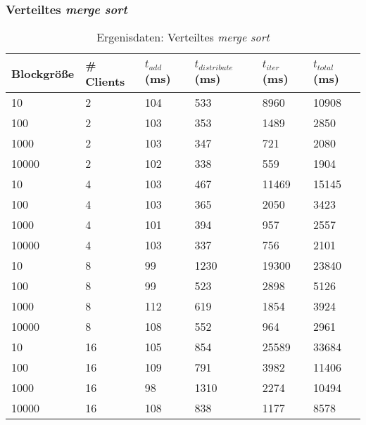 \documentclass[fontsize=12pt,a4paper,headinclude=no,headings=small]{scrartcl}
\begin{document}
\subsubsection{Verteiltes \textit{merge sort}}
\begin{table}[htp]
\begin{tabularx}{\textwidth}{ |X|X|X|X|X|X| }
\hline
Blockgröße & \# Clients & $t_{add}$ (ms) & $t_{distribute}$ (ms) & $t_{iter}$ (ms) & $t_{total}$ (ms) \\
\hline
10 & 2 & 104 & 533 & 8960 & 10908 \\
100 & 2 & 103 & 353 & 1489 & 2850 \\
1000 & 2 & 103 & 347 & 721 & 2080 \\
10000 & 2 & 102 & 338 & 559 & 1904 \\
\hline
10 & 4 & 103 & 467 & 11469 & 15145 \\
100 & 4 & 103 & 365 & 2050 & 3423 \\
1000 & 4 & 101 & 394 & 957 & 2557 \\
10000 & 4 & 103 & 337 & 756 & 2101 \\
\hline
10 & 8 & 99 & 1230 & 19300 & 23840 \\
100 & 8 & 99 & 523 & 2898 & 5126 \\
1000 & 8 & 112 & 619 & 1854 & 3924 \\
10000 & 8 & 108 & 552 & 964 & 2961 \\
\hline
10 & 16 & 105 & 854 & 25589 & 33684 \\
100 & 16 & 109 & 791 & 3982 & 11406 \\
1000 & 16 & 98 & 1310 & 2274 & 10494 \\
10000 & 16 & 108 & 838 & 1177 & 8578 \\
\hline
\end{tabularx}
\caption{Ergenisdaten: Verteiltes \textit{merge sort}}
\end{table}
\end{document}
